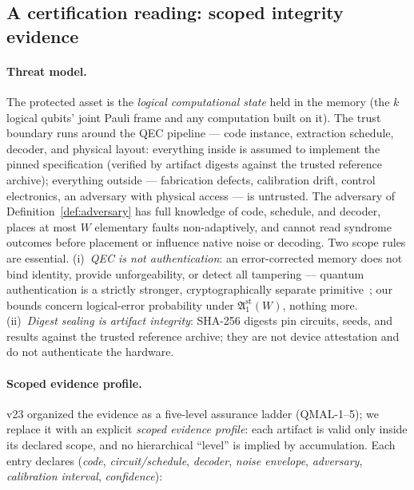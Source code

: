 \documentclass[11pt,a4paper]{article}
\begin{document}
\subsection{A certification reading: scoped integrity evidence}
\label{ssec:qmic}

\paragraph{Threat model.}
The protected asset is the \emph{logical computational state} held in
the memory (the $k$ logical qubits' joint Pauli frame and any
computation built on it). The trust boundary runs around the QEC
pipeline --- code instance, extraction schedule, decoder, and physical
layout: everything inside is assumed to implement the pinned
specification (verified by artifact digests against the trusted
reference archive); everything outside --- fabrication defects,
calibration drift, control electronics, an adversary with physical
access --- is untrusted. The adversary of
Definition~\ref{def:adversary} has full knowledge of code, schedule,
and decoder, places at most $W$ elementary faults non-adaptively, and
cannot read syndrome outcomes before placement or influence native
noise or decoding. Two scope rules are essential. (i)~\emph{QEC is not
authentication}: an error-corrected memory does not bind identity,
provide unforgeability, or detect all tampering --- quantum
authentication is a strictly stronger, cryptographically separate
primitive~\cite{barnum2002authentication,portmann2017recycling}; our
bounds concern logical-error probability under
$\mathfrak{A}_1^{\mathrm{st}}(W)$, nothing more.
(ii)~\emph{Digest sealing is artifact integrity}: SHA-256 digests pin
circuits, seeds, and results against the trusted reference archive;
they are not device attestation and do not authenticate the hardware.

\paragraph{Scoped evidence profile.}
v23 organized the evidence as a five-level assurance ladder (QMAL-1--5);
we replace it with an explicit \emph{scoped evidence profile}: each
artifact is valid only inside its declared scope, and no hierarchical
``level'' is implied by accumulation. Each entry declares
(\emph{code}, \emph{circuit/schedule}, \emph{decoder}, \emph{noise
envelope}, \emph{adversary}, \emph{calibration interval},
\emph{confidence}):
\end{document}
